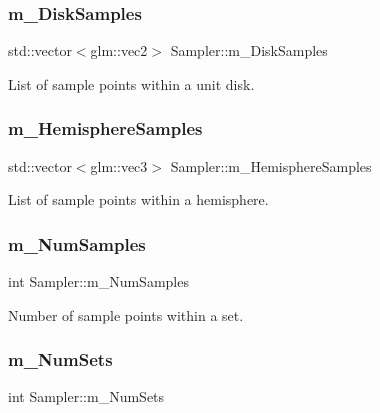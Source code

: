 \subsubsection{\texorpdfstring{m\+\_\+\+Disk\+Samples}{m\_DiskSamples}}
{\footnotesize\ttfamily std\+::vector$<$glm\+::vec2$>$ Sampler\+::m\+\_\+\+Disk\+Samples\hspace{0.3cm}{\ttfamily [protected]}}

List of sample points within a unit disk. \hypertarget{class_sampler_afd09bd7c820d74c4d658cbef5cb46020}{}\label{class_sampler_afd09bd7c820d74c4d658cbef5cb46020} 
\subsubsection{\texorpdfstring{m\+\_\+\+Hemisphere\+Samples}{m\_HemisphereSamples}}
{\footnotesize\ttfamily std\+::vector$<$glm\+::vec3$>$ Sampler\+::m\+\_\+\+Hemisphere\+Samples\hspace{0.3cm}{\ttfamily [protected]}}

List of sample points within a hemisphere. \hypertarget{class_sampler_a8b2c214702841cc163f3cb2a2218284a}{}\label{class_sampler_a8b2c214702841cc163f3cb2a2218284a} 
\subsubsection{\texorpdfstring{m\+\_\+\+Num\+Samples}{m\_NumSamples}}
{\footnotesize\ttfamily int Sampler\+::m\+\_\+\+Num\+Samples\hspace{0.3cm}{\ttfamily [protected]}}

Number of sample points within a set. \hypertarget{class_sampler_a3a4c91f58f0ddb1d479ae476e689d71e}{}\label{class_sampler_a3a4c91f58f0ddb1d479ae476e689d71e} 
\subsubsection{\texorpdfstring{m\+\_\+\+Num\+Sets}{m\_NumSets}}
{\footnotesize\ttfamily int Sampler\+::m\+\_\+\+Num\+Sets\hspace{0.3cm}{\ttfamily [protected]}}

